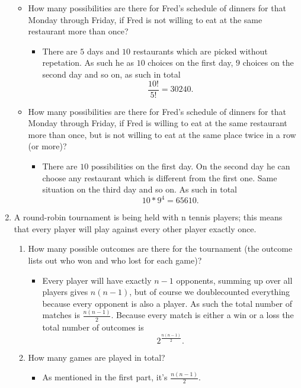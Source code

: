 \documentclass{article}
\begin{document}
\begin{enumerate}
		\begin{itemize}
			\item How many possibilities are there for Fred’s schedule of dinners for that Monday through Friday, if Fred is not willing to eat at the same restaurant more than once?
				\begin{itemize}
					\item There are $5$ days and $10$ restaurants which are picked without repetation. As such he as $10$ choices on the first day, $9$ choices on the second day and so on, as such in total
					$$
					\frac{10!}{5!} = 30240.
					$$
				\end{itemize}
			\item How many possibilities are there for Fred’s schedule of dinners for that Monday through Friday, if Fred is willing to eat at the same restaurant more than once, but is not willing to eat at the same place twice in a row (or more)?
				\begin{itemize}
					\item There are $10$ possibilities on the first day. On the second day he can choose any restaurant which is different from the first one. Same situation on the third day and so on. As such in total
					$$
					10 * 9^4 = 65610.
					$$
				\end{itemize}
		\end{itemize}
	\item A round-robin tournament is being held with n tennis players; this means that every player will play against every other player exactly once.
		\begin{enumerate}
			\item How many possible outcomes are there for the tournament (the outcome lists out who won and who lost for each game)?
				\begin{itemize}
					\item Every player will have exactly $n - 1$ opponents, summing up over all players gives $n(n - 1)$, but of course we doublecounted everything because every opponent is also a player. As such the total number of matches is $\frac{n(n - 1)}{2}$. Because every match is either a win or a loss the total number of outcomes is
					$$
					2^{\frac{n(n - 1)}{2}}.
					$$
				\end{itemize}
			\item How many games are played in total?
				\begin{itemize}
					\item As mentioned in the first part, it's $\frac{n(n - 1)}{2}$.

\end{itemize}
\end{enumerate}
\end{enumerate}
\end{document}
